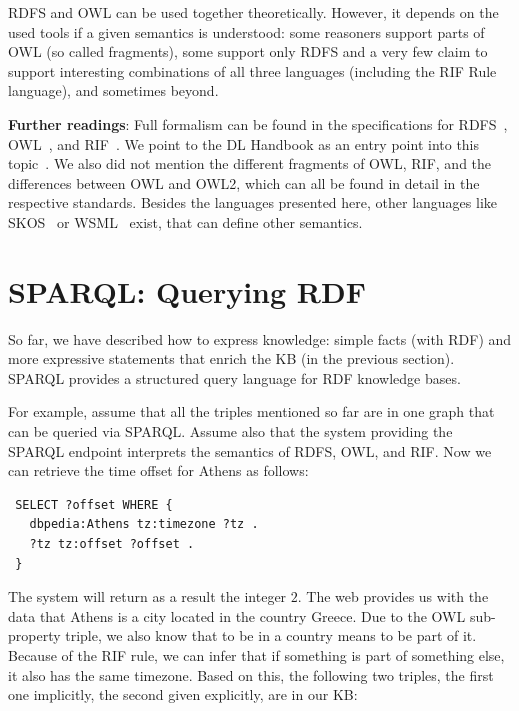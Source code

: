 RDFS and OWL can be used together theoretically.
However, it depends on the used tools if a given semantics is understood: some reasoners support parts of OWL (so called fragments), some support only RDFS and a very few claim to support interesting combinations of all three languages (including the RIF Rule language), and sometimes beyond.

\medskip

\textbf{Further readings}:
Full formalism can be found in the specifications for RDFS~\cite{rdfs}, OWL~\cite{owl}, and RIF~\cite{rif}.
We point to the DL Handbook as an entry point into this topic~\cite{dl-handbook}.
We also did not mention the different fragments of OWL, RIF, and the differences between OWL and OWL2, which can all be found in detail in the respective standards.
Besides the languages presented here, other languages like SKOS~\cite{skos} or WSML~\cite{wsml} exist, that can define other semantics.

\section{SPARQL: Querying RDF}
\label{sparql}

So far, we have described how to express knowledge: simple facts (with \ac{RDF}) and more expressive statements that enrich the \ac{KB} (in the previous section).
SPARQL provides a structured query language for \ac{RDF} knowledge bases.

For example, assume that all the triples mentioned so far are in one graph that can be queried via SPARQL.
Assume also that the system providing the SPARQL endpoint interprets the semantics of RDFS, OWL, and RIF.
Now we can retrieve the time offset for Athens as follows:

\begin{verbatim}
 SELECT ?offset WHERE {
   dbpedia:Athens tz:timezone ?tz .
   ?tz tz:offset ?offset .
 }
\end{verbatim}

The system will return as a result the integer $2$.
The web provides us with the data that Athens is a city located in the country Greece.
Due to the OWL sub-property triple, we also know that to be in a country means to be part of it.
Because of the RIF rule, we can infer that if something is part of something else, it also has the same timezone.
Based on this, the following two triples, the first one implicitly, the second given explicitly, are in our \ac{KB}:

